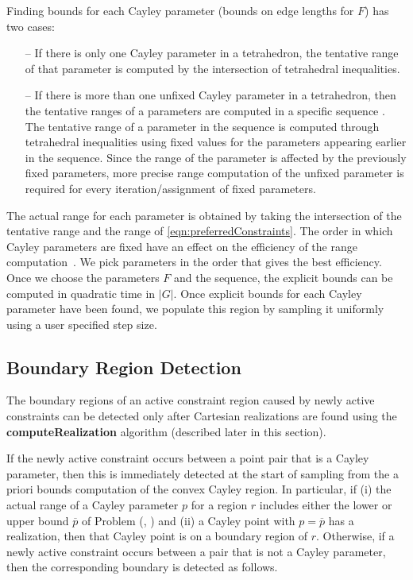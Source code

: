 Finding bounds for each Cayley parameter (bounds on edge lengths for $F$) has
two cases:
\begin{itemize}
\item[--] If there is only one Cayley parameter in a tetrahedron, the tentative
range of that parameter is computed by the intersection of tetrahedral
inequalities.

\item[--] If there is more than one unfixed Cayley parameter in a tetrahedron,
then the tentative ranges of a parameters are computed in a specific sequence
\cite{ugandhar}. The tentative range of a parameter in the sequence is computed
through tetrahedral inequalities using fixed values for the parameters
appearing earlier in the sequence. Since the range of the parameter is affected
by the previously fixed parameters, more precise range computation of the
unfixed parameter is required for every iteration/assignment of fixed
parameters.
\end{itemize}

The actual range for each parameter is obtained by taking the intersection of
the tentative range and the range of \ref{eqn:preferredConstraints}. The
order in which Cayley parameters are fixed have an effect
on the efficiency of the range computation~\cite{ugandhar}. We pick parameters
in the order that gives the best efficiency. Once we choose the parameters $F$
and the sequence, the explicit bounds can be computed in quadratic time in
$|G|$.  Once explicit bounds for each Cayley parameter have been found, we
populate this region by sampling it uniformly using a user specified step size. 

\subsection{Boundary Region Detection}
\label{sec:boundarydetection}
The boundary regions of an active constraint region caused by newly active
constraints can be detected only after Cartesian realizations are found using
the \textbf{computeRealization} algorithm (described later in this section). 


If the newly active constraint occurs between a point pair that is a Cayley
parameter, then this is immediately detected at the start of sampling from the a
priori bounds computation of the convex Cayley region. In particular, if (i)
the actual range of a Cayley parameter $p$ for a region $r$ includes either the
lower or upper bound $\overline{p}$ of Problem (\cone, \ctwo)
and (ii) a Cayley point with $p = \overline{p}$
has a realization, then that Cayley point is on a boundary region of $r$.
Otherwise, if a newly active constraint occurs between a pair that is not a
Cayley parameter, then the corresponding boundary is detected as follows.


